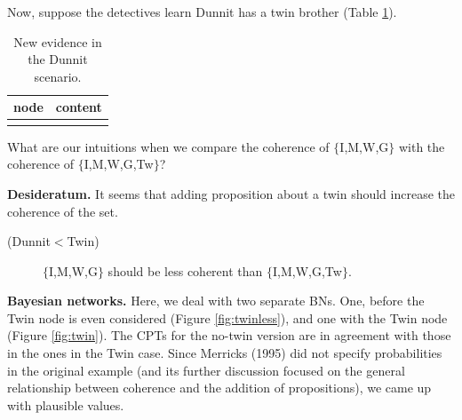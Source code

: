 \documentclass[
  10pt,
]{scrartcl}
\newcommand{\s}[1]{\textsf{#1}}
\begin{document}
\noindent Now, suppose the detectives learn Dunnit has a twin brother (Table \ref{tab:dunnitPropositions3}).

\begin{table}[H]

\caption{\label{tab:dunnitPropositions3}New evidence in the Dunnit scenario.}
\centering
\begin{tabular}[t]{l>{\raggedright\arraybackslash}p{25em}}
\toprule
node & content\\
\midrule
\cellcolor{gray!6}{Tw} & \cellcolor{gray!6}{Dunnit has an identical twin which was seen by the credible witness two hundred miles from the scene of the crime during the murder.}\\
\bottomrule
\end{tabular}
\end{table}

\noindent What are our intuitions when we compare the coherence of \(\{\)\s{I,M,W,G}\(\}\) with the coherence of \(\{\)\s{I,M,W,G,Tw}\(\}\)?

\vspace{1mm}

\noindent \textbf{Desideratum.} It seems that adding proposition about a twin should increase the coherence of the set.

\vspace{2mm}\begin{description}
    \item[(Dunnit$<$Twin)] $\{$\s{I,M,W,G}$\}$ should be less coherent than $\{$\s{I,M,W,G,Tw}$\}$. 
\end{description}\vspace{2mm}

\textbf{Bayesian networks.} Here, we deal with two separate BNs. One, before the \textsf{Twin} node is even considered (Figure \ref{fig:twinless}), and one with the \textsf{Twin} node (Figure \ref{fig:twin}). The CPTs for the no-twin version are in agreement with those in the ones in the Twin case. Since Merricks (1995) did not specify probabilities in the original example (and its further discussion focused on the general relationship between coherence and the addition of propositions), we came up with plausible values.
\end{document}

